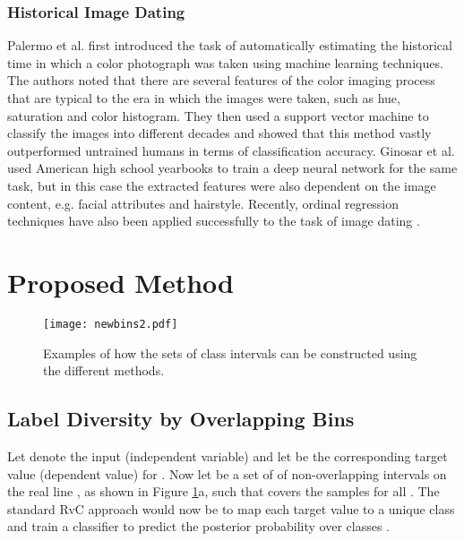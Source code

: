 \documentclass[10pt, conference, a4paper]{IEEEtran}
\begin{document}
\subsubsection{Historical Image Dating}
Palermo et al. \cite{DBLP:conf/eccv/PalermoHE12} first introduced the task of automatically estimating the historical time in which a color photograph was taken using machine learning techniques. The authors noted that there are several features of the color imaging process that are typical to the era in which the images were taken, such as hue, saturation and color histogram. They then used a support vector machine to classify the images into different decades and showed that this method vastly outperformed untrained humans in terms of classification accuracy. Ginosar et al. \cite{ginosar2015century} used American high school yearbooks to train a deep neural network for the same task, but in this case the extracted features were also dependent on the image content, e.g. facial attributes and hairstyle. Recently, ordinal regression techniques have also been applied successfully to the task of image dating \cite{liu2017deep, belharbi2019deep}. 

\section{Proposed Method}

\begin{figure}[t]
  \centering
  
  

  
  \texttt{[image: newbins2.pdf]}
  \caption{Examples of how the sets of class intervals  can be constructed using the different methods.}
 \label{classes_fig}
\end{figure}

\subsection{Label Diversity by Overlapping Bins}
Let  denote the  input (independent variable) and let  be the corresponding target value (dependent value) for . Now let  be a set of of non-overlapping intervals on the real line , as shown in Figure \ref{classes_fig}a, such that  covers the samples  for all . The standard RvC approach would now be to map each target value  to a unique class  and train a classifier to predict the posterior probability over classes .
\end{document}
